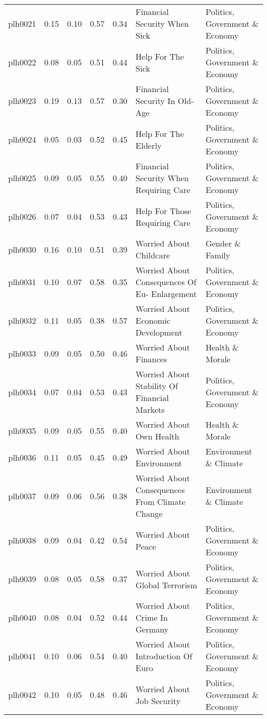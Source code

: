 \begin{longtable}{l|rrrrll}
plh0021 & 0.15 & 0.10 & 0.57 & 0.34 & Financial Security When Sick & Politics, Government \& Economy \\ 
plh0022 & 0.08 & 0.05 & 0.51 & 0.44 & Help For The Sick & Politics, Government \& Economy \\ 
plh0023 & 0.19 & 0.13 & 0.57 & 0.30 & Financial Security In Old-Age & Politics, Government \& Economy \\ 
plh0024 & 0.05 & 0.03 & 0.52 & 0.45 & Help For The Elderly & Politics, Government \& Economy \\ 
plh0025 & 0.09 & 0.05 & 0.55 & 0.40 & Financial Security When Requiring Care & Politics, Government \& Economy \\ 
plh0026 & 0.07 & 0.04 & 0.53 & 0.43 & Help For Those Requiring Care & Politics, Government \& Economy \\ 
plh0030 & 0.16 & 0.10 & 0.51 & 0.39 & Worried About Childcare & Gender \& Family \\ 
plh0031 & 0.10 & 0.07 & 0.58 & 0.35 & Worried About Consequences Of Eu- Enlargement & Politics, Government \& Economy \\ 
plh0032 & 0.11 & 0.05 & 0.38 & 0.57 & Worried About Economic Development & Politics, Government \& Economy \\ 
plh0033 & 0.09 & 0.05 & 0.50 & 0.46 & Worried About Finances & Health \& Morale \\ 
plh0034 & 0.07 & 0.04 & 0.53 & 0.43 & Worried About Stability Of Financial Markets & Politics, Government \& Economy \\ 
plh0035 & 0.09 & 0.05 & 0.55 & 0.40 & Worried About Own Health & Health \& Morale \\ 
plh0036 & 0.11 & 0.05 & 0.45 & 0.49 & Worried About Environment & Environment \& Climate \\ 
plh0037 & 0.09 & 0.06 & 0.56 & 0.38 & Worried About Consequences From Climate Change & Environment \& Climate \\ 
plh0038 & 0.09 & 0.04 & 0.42 & 0.54 & Worried About Peace & Politics, Government \& Economy \\ 
plh0039 & 0.08 & 0.05 & 0.58 & 0.37 & Worried About Global Terrorism & Politics, Government \& Economy \\ 
plh0040 & 0.08 & 0.04 & 0.52 & 0.44 & Worried About Crime In Germany & Politics, Government \& Economy \\ 
plh0041 & 0.10 & 0.06 & 0.54 & 0.40 & Worried About Introduction Of Euro & Politics, Government \& Economy \\ 
plh0042 & 0.10 & 0.05 & 0.48 & 0.46 & Worried About Job Security & Politics, Government \& Economy \\ 

\end{longtable}
